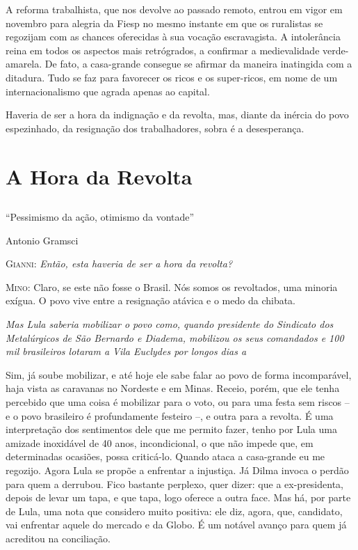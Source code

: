 A reforma trabalhista, que nos devolve ao passado remoto, entrou em
vigor em novembro para alegria da Fiesp no mesmo instante em que os
ruralistas se regozijam com as chances oferecidas à sua vocação
escravagista. A intolerância reina em todos os aspectos mais
retrógrados, a confirmar a medievalidade verde-amarela. De fato, a
casa-grande consegue se afirmar da maneira inatingida com a ditadura.
Tudo se faz para favorecer os ricos e os super-ricos, em nome de um
internacionalismo que agrada apenas ao capital.

Haveria de ser a hora da indignação e da revolta, mas, diante da inércia
do povo espezinhado, da resignação dos trabalhadores, sobra é a
desesperança.

\part{A Hora da Revolta}

\chapter*{}

\epigraph{``Pessimismo da ação, otimismo da vontade''}{Antonio Gramsci}


\parindent0pt
\parskip4pt

\textsc{Gianni:}
\itshape
 Então, esta haveria de ser a hora da revolta?

\normalfont\textsc{Mino:} Claro, se este não fosse o Brasil. Nós somos os
revoltados, uma minoria exígua. O povo vive entre a resignação atávica e
o medo da chibata.

\itshape
Mas Lula saberia mobilizar o povo como, quando
presidente do Sindicato dos Metalúrgicos de São Bernardo e Diadema,
mobilizou os seus comandados e 100 mil brasileiros lotaram a Vila
Euclydes por longos dias a%

\normalfont 
\normalfont
Sim, já soube mobilizar, e até hoje ele sabe falar ao
povo de forma incomparável, haja vista as caravanas no Nordeste e em
Minas. Receio, porém, que ele tenha percebido que uma coisa é mobilizar
para o voto, ou para uma festa sem riscos -- e o povo brasileiro é
profundamente festeiro --, e outra para a revolta. É uma interpretação
dos sentimentos dele que me permito fazer, tenho por Lula uma amizade
inoxidável de 40 anos, incondicional, o que não impede que, em
determinadas ocasiões, possa criticá-lo. Quando ataca a casa-grande eu
me regozijo. Agora Lula se propõe a enfrentar a injustiça. Já Dilma
invoca o perdão para quem a derrubou. Fico bastante perplexo, quer
dizer: que a ex-presidenta, depois de levar um tapa, e que tapa, logo
oferece a outra face. Mas há, por parte de Lula, uma nota que considero
muito positiva: ele diz, agora, que, candidato, vai enfrentar aquele do
mercado e da Globo. É um notável avanço para quem já acreditou na
conciliação.


